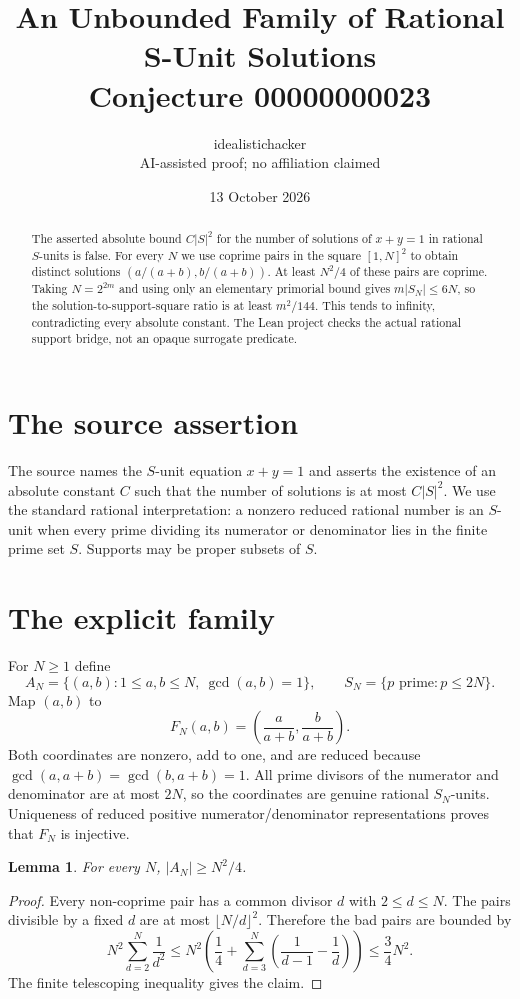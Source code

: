 \documentclass[10pt,a4paper]{article}
\title{An Unbounded Family of Rational S-Unit Solutions\\Conjecture 00000000023}
\author{idealistichacker\\\small AI-assisted proof; no affiliation claimed}
\date{13 October 2026}
\newtheorem{lemma}{Lemma}
\begin{document}
\maketitle
\begin{abstract}
The asserted absolute bound $C|S|^2$ for the number of solutions of $x+y=1$
in rational $S$-units is false. For every $N$ we use coprime pairs in the square
$[1,N]^2$ to obtain distinct solutions $(a/(a+b),b/(a+b))$. At least $N^2/4$
of these pairs are coprime. Taking $N=2^{2m}$ and using only an elementary
primorial bound gives $m|S_N|\leq6N$, so the solution-to-support-square ratio
is at least $m^2/144$. This tends to infinity, contradicting every absolute
constant. The Lean project checks the actual rational support bridge, not an
opaque surrogate predicate.
\end{abstract}

\section{The source assertion}
The source names the $S$-unit equation $x+y=1$ and asserts the existence
of an absolute constant $C$ such that the number of solutions is at most
$C|S|^2$. We use the standard rational interpretation: a nonzero reduced rational
number is an $S$-unit when every prime dividing its numerator or denominator lies
in the finite prime set $S$. Supports may be proper subsets of $S$.

\section{The explicit family}
For $N\geq1$ define
\[
 A_N=\{(a,b):1\leq a,b\leq N,\ \gcd(a,b)=1\},\qquad
 S_N=\{p\text{ prime}:p\leq2N\}.
\]
Map $(a,b)$ to
\[
 F_N(a,b)=\left(\frac{a}{a+b},\frac{b}{a+b}\right).
\]
Both coordinates are nonzero, add to one, and are reduced because
$\gcd(a,a+b)=\gcd(b,a+b)=1$. All prime divisors of the numerator and denominator
are at most $2N$, so the coordinates are genuine rational $S_N$-units.
Uniqueness of reduced positive numerator/denominator representations proves that
$F_N$ is injective.

\begin{lemma}
For every $N$, $|A_N|\geq N^2/4$.
\end{lemma}
\begin{proof}
Every non-coprime pair has a common divisor $d$ with $2\leq d\leq N$.
The pairs divisible by a fixed $d$ are at most $\lfloor N/d\rfloor^2$.
Therefore the bad pairs are bounded by
\[
N^2\sum_{d=2}^{N}\frac1{d^2}\leq
N^2\left(\frac14+\sum_{d=3}^{N}\left(\frac1{d-1}-\frac1d\right)\right)\leq\frac34N^2.
\]
The finite telescoping inequality gives the claim.
\end{proof}
\end{document}
